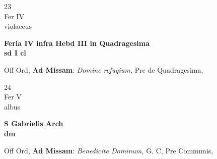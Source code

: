 \documentclass[10pt, openany]{book}
\begin{document}
        \begin{center}
            \begin{minipage}{3.5in}
                \vspace{2em}
                \begin{minipage}{0.5in}
                    {\Huge 23} \\
                    {\normalsize Fer IV} \\
                    {\normalsize violaceus}
                \end{minipage}
                \begin{minipage}{3.0in}
                    \textbf{ \large Feria IV infra Hebd III in Quadragesima \\
                    \textnormal{\normalsize sd I cl}} \\ 
                \end{minipage}
                \begin{justify}Off Ord, \textbf{Ad Missam}: \textit{Domine refugium,} Pre de Quadragesima,   
                \end{justify}
            \end{minipage}
        \end{center}
    
        \begin{center}
            \begin{minipage}{3.5in}
                \vspace{2em}
                \begin{minipage}{0.5in}
                    {\Huge 24} \\
                    {\normalsize Fer V} \\
                    {\normalsize albus}
                \end{minipage}
                \begin{minipage}{3.0in}
                    \textbf{ \large S Gabrielis Arch \\
                    \textnormal{\normalsize dm}} \\ 
                \end{minipage}
                \begin{justify}Off Ord, \textbf{Ad Missam}: \textit{Benedicite Dominum,} G, C, Pre Communis,   
                \end{justify}
            \end{minipage}
        \end{center}
    
\end{document}
